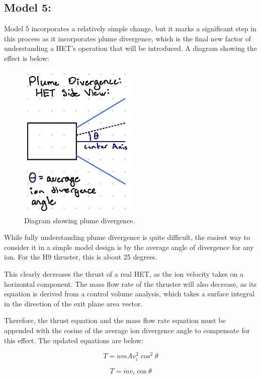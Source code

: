 \documentclass[letterpaper, 10 pt, conference]{ieeeconf}  %
\begin{document}
\subsection{Model 5:}
Model 5 incorporates a relatively simple change, but it marks a significant step in this process as it incorporates plume divergence, which is the final new factor of understanding a HET’s operation that will be introduced. A diagram showing the effect is below:

\begin{figure}[H]
      \centering
      \includegraphics[width=2.2in]{Images/div.png}
      \caption{Diagram showing plume divergence.}
      \label{fig:6}
\end{figure}

While fully understanding plume divergence is quite difficult, the easiest way to consider it in a simple model design is by the average angle of divergence for any ion. For the H9 thruster, this is about 25 degrees.

This clearly decreases the thrust of a real HET, as the ion velocity takes on a horizontal component. The mass flow rate of the thruster will also decrease, as its equation is derived from a control volume analysis, which takes a surface integral in the direction of the exit plane area vector.

Therefore, the thrust equation and the mass flow rate equation must be appended with the cosine of the average ion divergence angle to compensate for this effect. The updated equations are below:

\begin{equation} \label{eq:12}
T = nmAv_i^2\cos^{2}\theta
\end{equation}

\begin{equation} \label{eq:13}
T = \dot{m}v_i\cos{\theta}
\end{equation}
\end{document}
